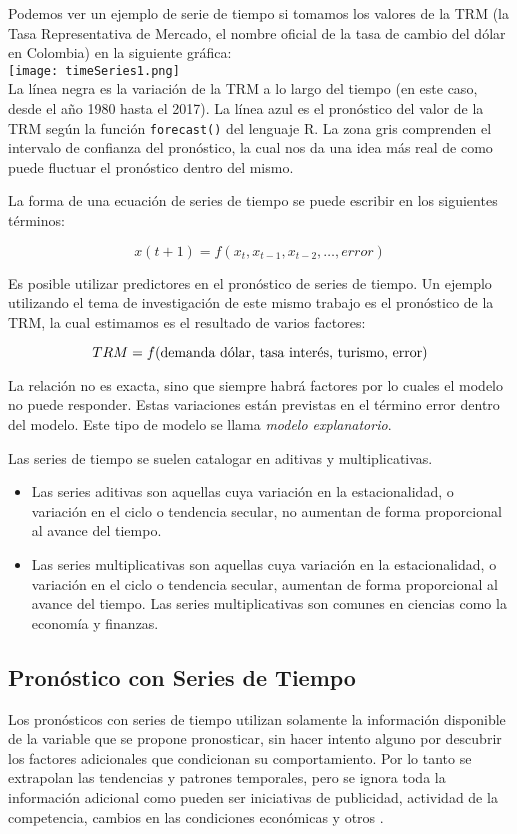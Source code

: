 Podemos ver un ejemplo de serie de tiempo si tomamos los valores de la TRM (la Tasa Representativa de Mercado, el nombre oficial de la tasa de cambio del dólar en Colombia) en la siguiente gráfica:\\

\texttt{[image: timeSeries1.png]}\\

La línea negra es la variación de la TRM a lo largo del tiempo (en este caso, desde el año 1980 hasta el 2017). La línea azul es el pronóstico del valor de la TRM según la función \texttt{forecast()} del lenguaje R. La zona gris comprenden el intervalo de confianza del pronóstico, la cual nos da una idea más real de como puede fluctuar el pronóstico dentro del mismo.

La forma de una ecuación de series de tiempo se puede escribir en los siguientes términos:

\[ x(t+1) = f(x_t, x_{t-1}, x_{t-2}, \ldots, error) \]

Es posible utilizar predictores en el pronóstico de series de tiempo. Un ejemplo utilizando el tema de investigación de este mismo trabajo es el pronóstico de la TRM, la cual estimamos es el resultado de varios factores:

\[ TRM = f(\textnormal{demanda dólar, tasa interés, turismo, error}) \]

La relación no es exacta, sino que siempre habrá factores por lo cuales el modelo no puede responder. Estas variaciones están previstas en el término error dentro del modelo. Este tipo de modelo se llama \emph{modelo explanatorio}.

Las series de tiempo se suelen catalogar en aditivas y multiplicativas.

\begin{itemize}
	\item Las series aditivas son aquellas cuya variación en la estacionalidad, o variación en el ciclo o tendencia secular, no aumentan de forma proporcional al avance del tiempo.
	\item Las series multiplicativas son aquellas cuya variación en la estacionalidad, o variación en el ciclo o tendencia secular, aumentan de forma proporcional al avance del tiempo. Las series multiplicativas son comunes en ciencias como la economía y finanzas.
\end{itemize}

\subsection*{Pronóstico con Series de Tiempo}
Los pronósticos con series de tiempo utilizan solamente la información disponible de la variable que se propone pronosticar, sin hacer intento alguno por descubrir los factores adicionales que condicionan su comportamiento. Por lo tanto se extrapolan las tendencias y patrones temporales, pero se ignora toda la información adicional como pueden ser iniciativas de publicidad, actividad de la competencia, cambios en las condiciones económicas y otros \cite{hyndman}.

